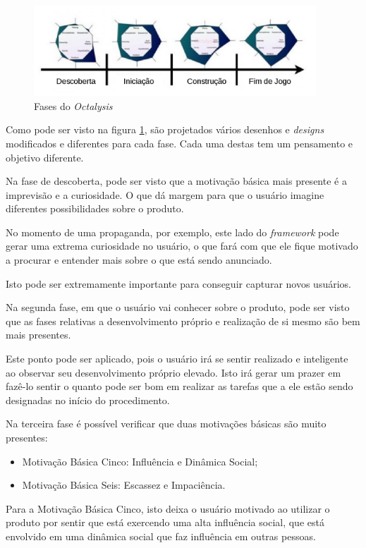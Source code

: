 \begin{figure}[h]
    \centering
    \includegraphics[width=400px, scale=1]{figuras/fasesoctalysis}
    \caption{Fases do \textit{Octalysis}}
    \label{fig:fasesoctalysis}
\end{figure}

Como pode ser visto na figura \ref{fig:fasesoctalysis}, são projetados vários
desenhos e \textit{designs} modificados e diferentes para cada fase. Cada uma destas
tem um pensamento e objetivo diferente.

Na fase de descoberta, pode ser visto que a motivação básica mais presente é
a imprevisão e a curiosidade. O que dá margem para que o usuário imagine diferentes
possibilidades sobre o produto.

No momento de uma propaganda, por exemplo, este lado do \textit{framework} pode gerar uma
extrema curiosidade no usuário, o que fará com que ele fique motivado a procurar
e entender mais sobre o que está sendo anunciado.

Isto pode ser extremamente importante para conseguir capturar novos usuários.

Na segunda fase, em que o usuário vai conhecer sobre o produto, pode ser visto
que as fases relativas a desenvolvimento próprio e realização de si mesmo
são bem mais presentes.

Este ponto pode ser aplicado, pois o usuário irá se sentir realizado e inteligente
ao observar seu desenvolvimento próprio elevado. Isto irá gerar um prazer em fazê-lo
sentir o quanto pode ser bom em realizar as tarefas que a ele estão sendo designadas
no início do procedimento.

Na terceira fase é possível verificar que duas motivações básicas são muito presentes:

\begin{itemize}
    \item Motivação Básica Cinco: Influência e Dinâmica Social;
    \item Motivação Básica Seis: Escassez e Impaciência.
\end{itemize}


Para a Motivação Básica Cinco, isto deixa o usuário motivado ao utilizar o produto
por sentir que está exercendo uma alta influência social, que está envolvido em
uma dinâmica social que faz influência em outras pessoas.

